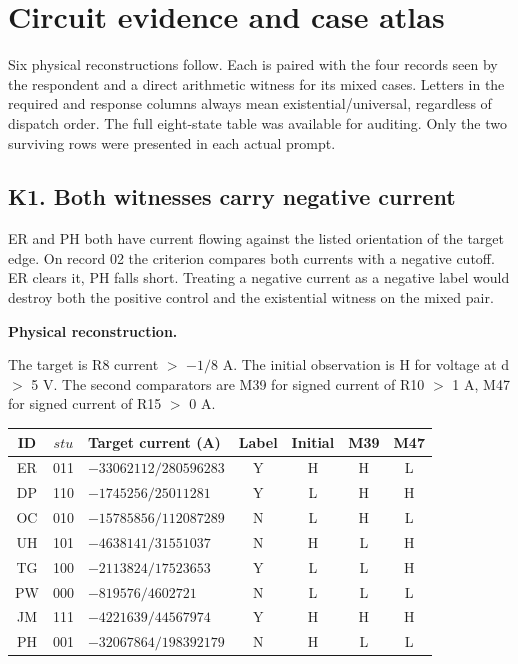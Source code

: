 \documentclass[12pt,letterpaper]{article}
\newcommand{\reading}[2]{\par\smallskip\textsf{\color{accent}\bfseries #1}\enspace #2\par}
\begin{document}
\clearpage\section{Circuit evidence and case atlas}
Six physical reconstructions follow. Each is paired with the four records seen by the respondent and a direct arithmetic witness for its mixed cases. Letters in the required and response columns always mean existential/universal, regardless of dispatch order. The full eight-state table was available for auditing. Only the two surviving rows were presented in each actual prompt.

\subsection*{K1. Both witnesses carry negative current}

ER and PH both have current flowing against the listed orientation of the target edge. On record 02 the criterion compares both currents with a negative cutoff. ER clears it, PH falls short. Treating a negative current as a negative label would destroy both the positive control and the existential witness on the mixed pair.

\reading{Physical reconstruction.}{} The target is R8 current $>$ $-1/8$ A. The initial observation is H for voltage at d $>$ 5 V. The second comparators are M39 for signed current of R10 $>$ 1 A, M47 for signed current of R15 $>$ 0 A.

\begin{center}{\small\setlength{\tabcolsep}{4pt}\begin{tabularx}{\linewidth}{@{}ccYcccc@{}}\toprule
ID & $stu$ & Target current (A) & Label & Initial & M39 & M47\\\midrule
ER & 011 & $-33062112/280596283$ & Y & H & H & L\\
DP & 110 & $-1745256/25011281$ & Y & L & H & H\\
OC & 010 & $-15785856/112087289$ & N & L & H & L\\
UH & 101 & $-4638141/31551037$ & N & H & L & H\\
TG & 100 & $-2113824/17523653$ & Y & L & L & H\\
PW & 000 & $-819576/4602721$ & N & L & L & L\\
JM & 111 & $-4221639/44567974$ & Y & H & H & H\\
PH & 001 & $-32067864/198392179$ & N & H & L & L\\
\bottomrule\end{tabularx}}\end{center}
\end{document}
